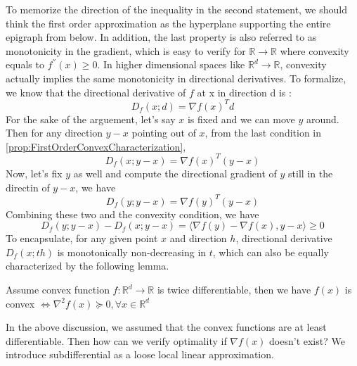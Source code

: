 \begin{remark}
    To memorize the direction of the inequality in the second statement, we should think the first order approximation as the hyperplane supporting the entire epigraph from below. In addition, the last property is also referred to as monotonicity in the gradient, which is easy to verify for $\mathbb{R} \rightarrow \mathbb{R}$ where convexity equals to $f^{''}(x) \geq 0$. In higher dimensional spaces like $\mathbb{R}^d \rightarrow \mathbb{R}$, convexity actually implies the same monotonicity in directional derivatives. To formalize, we know that the directional derivative of $f$ at x in direction d is :
    \begin{equation*}
        D_f(x;d) = \nabla f(x)^Td
    \end{equation*}
    For the sake of the arguement, let's say $x$ is fixed and we can move $y$ around. Then for any direction $y-x$ pointing out of $x$, from the last condition in \ref{prop:FirstOrderConvexCharacterization}, 
    \begin{equation*}
        D_f(x;y-x) = \nabla f(x)^T(y-x)
    \end{equation*}
    Now, let's fix $y$ as well and compute the directional gradient of $y$ still in the directin of $y-x$, we have
    \begin{equation*}
        D_f(y;y-x) = \nabla f(y)^T(y-x)
    \end{equation*}
    Combining these two and the convexity condition, we have
    \begin{equation*}
        D_f(y;y-x) - D_f(x;y-x) = \langle \nabla f(y) - \nabla f(x), y-x \rangle \geq 0
    \end{equation*}
    To encapsulate, for any given point $x$ and direction $h$, directional derivative $D_f(x ; th)$ is monotonically non-decreasing in $t$, which can also be equally characterized by the following lemma.
\end{remark}

\begin{lemma}
    Assume convex function $f: \mathbb{R}^d \rightarrow \mathbb{R}$ is twice differentiable, then we have $f(x)$ is convex $\iff \nabla^2f(x) \succeq 0, \forall x \in \mathbb{R}^d$
\end{lemma}


In the above discussion, we assumed that the convex functions are at least differentiable. Then how can we verify optimality if $\nabla f(x)$ doesn't exist? We introduce subdifferential as a loose local linear approximation.

